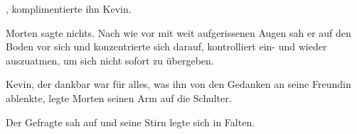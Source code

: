 \par

, komplimentierte ihn Kevin. 

\par

Morten sagte nichts. Nach wie vor mit weit aufgerissenen Augen sah er auf den Boden vor sich und konzentrierte sich darauf, kontrolliert ein- und wieder auszuatmen, um sich nicht sofort zu übergeben.

\par

Kevin, der dankbar war für alles, was ihn von den Gedanken an seine Freundin ablenkte, legte Morten seinen Arm auf die Schulter. 

\par

Der Gefragte sah auf und seine Stirn legte sich in Falten. 